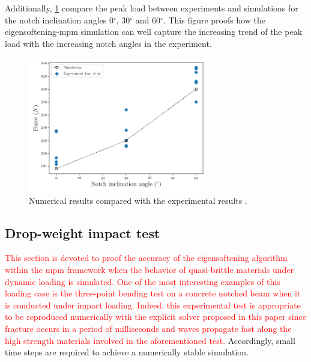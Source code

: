\documentclass[preprint,12pt,a4paper]{elsarticle}
\newcommand{\PNA}[1]{
  \textcolor{red}{{#1}}
}
\begin{document}
Additionally, \ref{fig:plot-Angle-Forces-test} compare the peak load
between experiments and simulations for the notch inclination angles
0$^{\circ}$, 30$^{\circ}$ and 60$^{\circ}$. This figure proofs how the
eigensoftening-\acrshort{mpm} simulation can well capture the
increasing trend of the peak load with the increasing notch angles in
the experiment.
\begin{figure}
  \centering
  \includegraphics[width=0.7\textwidth]{./Figure-Angle-Forces-test}
  \caption{Numerical results compared with the experimental results \cite{LIM_1993}.}
  \label{fig:plot-Angle-Forces-test}
\end{figure}



\subsection{Drop-weight impact test}
\label{sec:3.3}
\PNA{This section is devoted to proof
the accuracy of the eigensoftening algorithm within the \acrshort{mpm} framework when the behavior
of quasi-brittle materials under dynamic loading is simulated. One of the most interesting examples of this
loading case is the three-point bending test on a concrete notched beam when it is conducted under impact loading. Indeed, this experimental test is appropriate to be reproduced numerically with the explicit solver proposed in this paper since
fracture occurs in a period of milliseconds and waves propagate fast along the high strength
materials involved in the aforementioned test.} Accordingly, small time steps are
required to achieve a numerically stable simulation.\\
\end{document}
